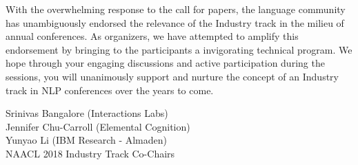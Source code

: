 With the overwhelming response to the call for papers, the language community has unambiguously endorsed the relevance of the Industry track in the milieu of annual conferences.  As organizers, we have attempted to amplify this endorsement by bringing to the participants a invigorating technical program. We hope through your engaging discussions and active participation during the sessions, you will unanimously support and nurture the concept of an Industry track in NLP conferences over the years to come.



\vskip 0.5in
\noindent Srinivas Bangalore (Interactions Labs) \\
Jennifer Chu-Carroll (Elemental Cognition) \\
Yunyao Li (IBM Research - Almaden) \\
NAACL 2018 Industry Track Co-Chairs



